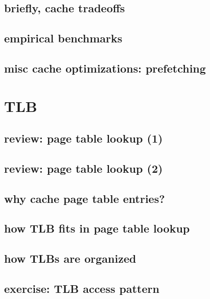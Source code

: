 \subsection{briefly, cache tradeoffs}



\subsection{empirical benchmarks}



\subsection{misc cache optimizations: prefetching}


\section{TLB}

\subsection{review: page table lookup (1)}


\subsection{review: page table lookup (2)}

\subsection{why cache page table entries?}


\subsection{how TLB fits in page table lookup}


\subsection{how TLBs are organized}

\subsection{exercise: TLB access pattern}




